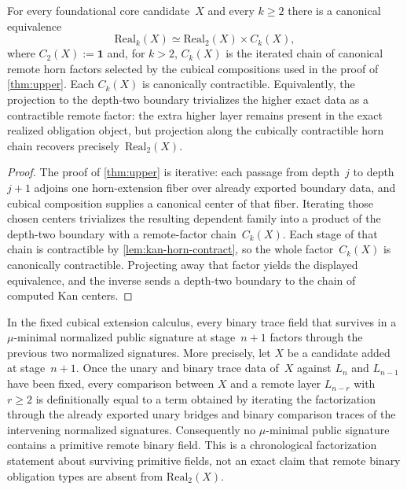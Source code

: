 \documentclass{lmcs}
\newcommand{\Real}{\mathrm{Real}}
\begin{document}
\begin{cor}
\label{cor:contractible-factor}
For every foundational core candidate~$X$ and every $k \geq 2$ there is a canonical equivalence
\[
  \Real_k(X) \simeq \Real_2(X) \times C_k(X),
\]
where $C_2(X) := \mathbf{1}$ and, for $k>2$, $C_k(X)$ is the iterated chain of canonical remote horn factors selected by the cubical compositions used in the proof of \autoref{thm:upper}. Each $C_k(X)$ is canonically contractible.
Equivalently, the projection to the depth-two boundary trivializes the higher exact data as a contractible remote factor: the extra higher layer remains present in the exact realized obligation object, but projection along the cubically contractible horn chain recovers precisely~$\Real_2(X)$.
\end{cor}

\begin{proof}
The proof of \autoref{thm:upper} is iterative: each passage from depth~$j$ to depth~$j+1$ adjoins one horn-extension fiber over already exported boundary data, and cubical composition supplies a canonical center of that fiber. Iterating those chosen centers trivializes the resulting dependent family into a product of the depth-two boundary with a remote-factor chain~$C_k(X)$. Each stage of that chain is contractible by \autoref{lem:kan-horn-contract}, so the whole factor~$C_k(X)$ is canonically contractible. Projecting away that factor yields the displayed equivalence, and the inverse sends a depth-two boundary to the chain of computed Kan centers.
\end{proof}

\begin{thm}
\label{lem:telescopic}
In the fixed cubical extension calculus, every binary trace field that survives in a $\mu$-minimal normalized public signature at stage~$n+1$ factors through the previous two normalized signatures. More precisely, let $X$ be a candidate added at stage~$n+1$. Once the unary and binary trace data of~$X$ against $L_n$ and $L_{n-1}$ have been fixed, every comparison between $X$ and a remote layer $L_{n-r}$ with $r \geq 2$ is definitionally equal to a term obtained by iterating the factorization through the already exported unary bridges and binary comparison traces of the intervening normalized signatures. Consequently no $\mu$-minimal public signature contains a primitive remote binary field.
This is a chronological factorization statement about surviving primitive fields, not an exact claim that remote binary obligation types are absent from $\Real_2(X)$.
\end{thm}
\end{document}
